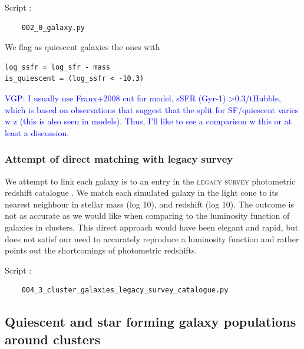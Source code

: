 \documentclass[fleqn,usenatbib,onecolumn]{mnras}
\begin{document}
Script :
\begin{verbatim}
    002_0_galaxy.py
\end{verbatim}


We flag as quiescent galaxies the  ones with 
\begin{verbatim}
log_ssfr = log_sfr - mass
is_quiescent = (log_ssfr < -10.3)
\end{verbatim}

\textcolor{blue}{VGP: I usually use Franx+2008 cut for model, sSFR (Gyr-1) >0.3/tHubble, which is based on observations that suggest that the split for SF/quiescent varies w z (this is also seen in models). Thus, I'll like to see a comparison w this or at least a discussion.}


\subsubsection*{Attempt of direct matching with legacy survey}
We attempt to link each galaxy is to an entry in the \textsc{legacy survey} photometric redshift catalogue \citep{Dey_2019AJ....157..168D,Zou_2019ApJS..242....8Z}. 
We match each simulated galaxy in the light cone to its nearest neighbour in stellar mass (log 10), and redshift (log 10). 
The outcome is not as accurate as we would like when comparing to the luminosity function of galaxies in clusters. 
This direct approach would have been elegant and rapid, but does not satisf our need to accurately reproduce a luminosity function and rather points out the shortcomings of photometric redshifts.

Script :
\begin{verbatim}
    004_3_cluster_galaxies_legacy_survey_catalogue.py
\end{verbatim}

\subsection{Quiescent and star forming galaxy populations around clusters}
\label{subsec:cluster:galaxies}
\end{document}

